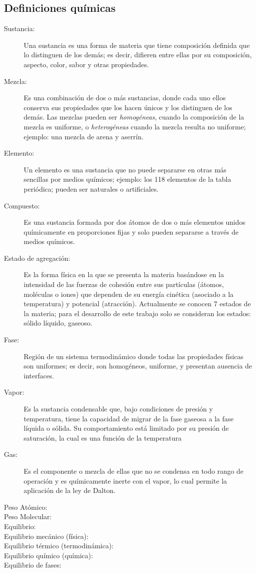 \subsection{Definiciones químicas}
    \begin{description}
        \item[Sustancia:] Una sustancia es una forma de materia que tiene composición definida  que lo distinguen de los demás; es decir, difieren entre ellas por su composición, aspecto, color, sabor y otras propiedades.
        \item[Mezcla:] Es una combinación de dos o más sustancias, donde cada uno ellos conserva sus propiedades que los hacen únicos y los distinguen de los demás. Las mezclas pueden ser \textit{homogéneas}, cuando la composición de la mezcla es uniforme, o \textit{heterogéneas} cuando la mezcla resulta no uniforme; ejemplo: una mezcla de arena y aserrín. 
        \item[Elemento:] Un elemento es una sustancia que no puede separarse en otras más sencillas por medios químicos; ejemplo: los 118 elementos de la tabla periódica; pueden ser naturales o artificiales.
        \item[Compuesto:] Es una sustancia formada por dos átomos de dos o más elementos unidos químicamente en proporciones fijas y solo pueden separarse a través de medios químicos.
        \item[Estado de agregación:] Es la forma física en la que se presenta la materia basándose en la intensidad de las fuerzas de cohesión entre sus partículas (átomos, moléculas o iones) que dependen de su energía cinética (asociado a la temperatura) y potencial (atracción). Actualmente se conocen 7 estados de la materia; para el desarrollo de este trabajo solo se consideran los estados: sólido líquido, gaseoso.
        \item[Fase:] Región de un sistema termodinámico donde todas las propiedades físicas son uniformes; es decir, son homogéneos, uniforme, y presentan ausencia de interfaces.
        \item[Vapor:] Es la sustancia condensable que, bajo condiciones de presión y temperatura, tiene la capacidad de migrar de la fase gaseosa a la fase líquida o sólida. Su comportamiento está limitado por su presión de saturación, la cual es una función de la temperatura
        \item[Gas:] Es el componente o mezcla de ellas que no se condensa en todo rango de operación y es químicamente inerte con el vapor, lo cual permite la aplicación de la ley de Dalton. 
        \item[Peso Atómico:] 
        \item[Peso Molecular:] 
        \item[Equilibrio:] 
        \item[Equilibrio mecánico (física):]
        \item[Equilibrio térmico (termodinámica):]
        \item[Equilibrio químico (química):]
        \item[Equilibrio de fases:]
    \end{description}


